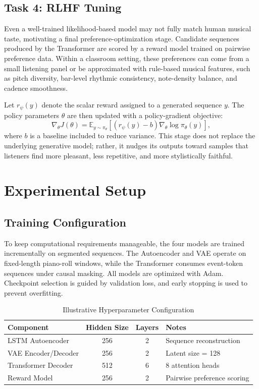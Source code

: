 \documentclass[conference]{IEEEtran}
\begin{document}
\subsection{Task 4: RLHF Tuning}
Even a well-trained likelihood-based model may not fully match human musical taste, motivating a final preference-optimization stage. Candidate sequences produced by the Transformer are scored by a reward model trained on pairwise preference data. Within a classroom setting, these preferences can come from a small listening panel or be approximated with rule-based musical features, such as pitch diversity, bar-level rhythmic consistency, note-density balance, and cadence smoothness.

Let $r_\psi(y)$ denote the scalar reward assigned to a generated sequence $y$. The policy parameters $\theta$ are then updated with a policy-gradient objective:
\begin{equation}
\nabla_\theta J(\theta) = \mathbb{E}_{y \sim \pi_\theta}[(r_\psi(y) - b)\nabla_\theta \log \pi_\theta(y)],
\end{equation}
where $b$ is a baseline included to reduce variance. This stage does not replace the underlying generative model; rather, it nudges its outputs toward samples that listeners find more pleasant, less repetitive, and more stylistically faithful.

\section{Experimental Setup}
\subsection{Training Configuration}
To keep computational requirements manageable, the four models are trained incrementally on segmented sequences. The Autoencoder and VAE operate on fixed-length piano-roll windows, while the Transformer consumes event-token sequences under causal masking. All models are optimized with Adam. Checkpoint selection is guided by validation loss, and early stopping is used to prevent overfitting.

\begin{table}[ht]
\centering
\caption{Illustrative Hyperparameter Configuration}
\begin{tabular}{|l|c|c|l|}
\hline
\textbf{Component} & \textbf{Hidden Size} & \textbf{Layers} & \textbf{Notes} \\ \hline
LSTM Autoencoder & 256 & 2 & Sequence reconstruction \\ \hline
VAE Encoder/Decoder & 256 & 2 & Latent size = 128 \\ \hline
Transformer Decoder & 512 & 6 & 8 attention heads \\ \hline
Reward Model & 256 & 2 & Pairwise preference scoring \\ \hline
\end{tabular}
\end{table}
\end{document}
